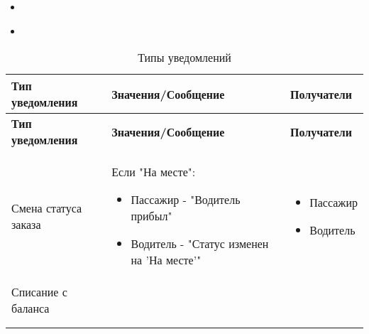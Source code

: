         \begin{itemize}
            \item {
            }
            \item 
        \end{itemize}

        \setlength{\extrarowheight}{2mm}
        \begin{longtable}{|p{3cm}|p{8cm}|p{4cm}|}
        \caption {Типы уведомлений}\\

        \hline     \textbf{Тип уведомления}&\textbf{Значения/Сообщение}&\textbf{Получатели} \\ [2mm]
        \endfirsthead
        \hline     \textbf{Тип уведомления}&\textbf{Значения/Сообщение}&\textbf{Получатели} \\ [2mm]
        \endhead

        \hline Смена статуса заказа  

            & 
                Если "На месте":
                \begin{itemize}
                    \item Пассажир - "Водитель прибыл"
                    \item Водитель - "Статус изменен на 'На месте'"
                \end{itemize}

            &
                \begin{itemize}
                    \item Пассажир
                    \item Водитель
                \end{itemize}
            \\ [2mm]

        \hline Списание с баланса  &  & \\ [2mm]
        \hline   &  & \\ [2mm]
        \hline

        \label{table_notificetion_types}
        \end{longtable}


